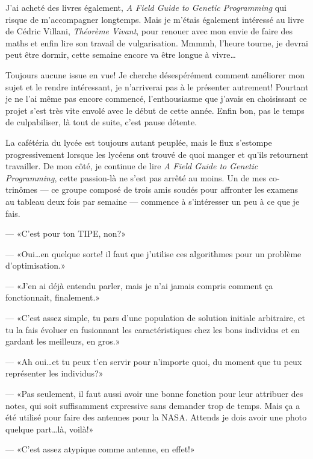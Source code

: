 \documentclass[letterpaper, 12pt]{report} %
\begin{document}
{J'ai acheté des livres également, \textit{A Field Guide to Genetic Programming} qui risque de m'accompagner longtemps.
Mais je m'étais également intéressé au livre de Cédric Villani, \textit{Théorème Vivant}, pour renouer avec mon envie de faire des maths et enfin lire son travail de vulgarisation. 
Mmmmh, l'heure tourne, je devrai peut être dormir, cette semaine encore va être longue à vivre\dots

Toujours aucune issue en vue!
Je cherche désespérément comment améliorer mon sujet et le rendre intéressant, je n'arriverai pas à le présenter autrement!
Pourtant je ne l'ai même pas encore commencé, l'enthousiasme que j'avais en choisissant ce projet s'est très vite envolé avec le début de cette année.
Enfin bon, pas le temps de culpabiliser, là tout de suite, c'est pause détente. 

La cafétéria du lycée est toujours autant peuplée, mais le flux s'estompe progressivement lorsque les lycéens ont trouvé de quoi manger et qu'ils retournent travailler. 
De mon côté, je continue de lire \textit{A Field Guide to Genetic Programming}, cette passion-là ne s'est pas arrêté au moins.
Un de mes co-trinômes --- ce groupe composé de trois amis soudés pour affronter les examens au tableau deux fois par semaine --- commence à s'intéresser un peu à ce que je fais.

--- «C'est pour ton TIPE, non?»

--- «Oui\dots en quelque sorte! il faut que j'utilise ces algorithmes pour un problème d'optimisation.»

--- «J'en ai déjà entendu parler, mais je n'ai jamais compris comment ça fonctionnait, finalement.»

--- «C'est assez simple, tu pars d'une population de solution initiale arbitraire, et tu la fais évoluer en fusionnant les caractéristiques chez les bons individus et en gardant les meilleurs, en gros.»

--- «Ah oui\dots et tu peux t'en servir pour n'importe quoi, du moment que tu peux représenter les individus?»

--- «Pas seulement, il faut aussi avoir une bonne fonction pour leur attribuer des notes, qui soit suffisamment expressive sans demander trop de temps. Mais ça a été utilisé pour faire des antennes pour la {NASA}. Attends je dois avoir une photo quelque part\dots là, voilà!»

--- «C'est assez atypique comme antenne, en effet!»

}
\end{document}
